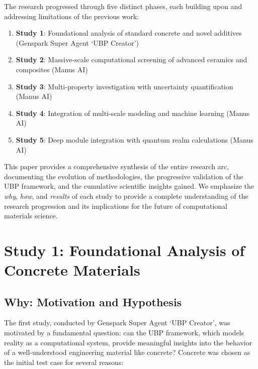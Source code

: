 \documentclass[11pt,a4paper]{article}
\begin{document}
The research progressed through five distinct phases, each building upon and addressing limitations of the previous work:

\begin{enumerate}
    \item \textbf{Study 1}: Foundational analysis of standard concrete and novel additives (Genspark Super Agent `UBP Creator')
    \item \textbf{Study 2}: Massive-scale computational screening of advanced ceramics and composites (Manus AI)
    \item \textbf{Study 3}: Multi-property investigation with uncertainty quantification (Manus AI)
    \item \textbf{Study 4}: Integration of multi-scale modeling and machine learning (Manus AI)
    \item \textbf{Study 5}: Deep module integration with quantum realm calculations (Manus AI)
\end{enumerate}

This paper provides a comprehensive synthesis of the entire research arc, documenting the evolution of methodologies, the progressive validation of the UBP framework, and the cumulative scientific insights gained. We emphasize the \textit{why}, \textit{how}, and \textit{results} of each study to provide a complete understanding of the research progression and its implications for the future of computational materials science.

\section{Study 1: Foundational Analysis of Concrete Materials}

\subsection{Why: Motivation and Hypothesis}

The first study, conducted by Genspark Super Agent `UBP Creator', was motivated by a fundamental question: can the UBP framework, which models reality as a computational system, provide meaningful insights into the behavior of a well-understood engineering material like concrete? Concrete was chosen as the initial test case for several reasons:
\end{document}
